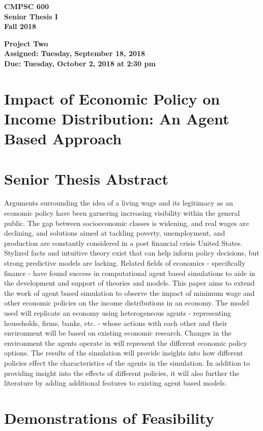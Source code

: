 \documentclass[11pt]{article}
\newcommand{\assignmentduedate}{October 2}
\newcommand{\assignmentassignedate}{September 18}
\newcommand{\assignmentnumber}{Two}
\newcommand{\labyear}{2018}
\newcommand{\labday}{Tuesday}
\newcommand{\labtime}{2:30 pm}
\newcommand{\assigneddate}{Assigned: \labday, \assignmentassignedate, \labyear{}}
\newcommand{\duedate}{Due: \labday, \assignmentduedate, \labyear{} at \labtime{}}
\newcommand{\projecttitle}[1]
{
  \begin{center}
    \begin{center}
      \bf
      CMPSC 600\\Senior Thesis I\\
      Fall 2018\\
      \medskip
    \end{center}
    \bf
    #1
  \end{center}
}
\begin{document}
\thispagestyle{empty}

\projecttitle{Project \assignmentnumber{} \\ \assigneddate{} \\ \duedate{}}

\section*{Impact of Economic Policy on Income Distribution: An Agent Based Approach}

\section*{Senior Thesis Abstract}

Arguments surrounding the idea of a living wage and its legitimacy as an economic policy have been garnering
increasing visibility within the general public. The gap between socioeconomic classes is widening, and
real wages are declining, and solutions aimed at tackling poverty, unemployment, and production are constantly
considered in a post financial crisis United States. Stylized facts and intuitive theory exist that can help
inform policy decisions, but strong predictive models are lacking. Related fields of economics - specifically
finance - have found success in computational agent based simulations to aide in the development and support
of theories and models. This paper aims to extend the work of agent based simulation to observe the impact of
minimum wage and other economic policies on the income distributions in an economy. The model used will replicate
an economy using heterogeneous agents - representing households, firms, banks, etc. - whose actions with each other
and their environment will be based on existing economic research. Changes in the environment the agents operate in
will represent the different economic policy options. The results of the simulation will provide insights into how
different policies effect the characteristics of the agents in the simulation. In addition to providing insight into the
effects of different policies, it will also further the literature by adding additional features to existing
agent based models.


\section*{Demonstrations of Feasibility}
\end{document}
